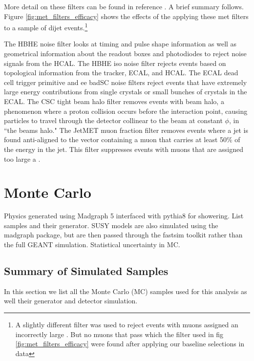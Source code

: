     More detail on these filters can be found in reference \cite[sec 5]{cms_met}. A brief summary follows. Figure \ref{fig:met_filters_efficacy} shows the effects of the applying these met filters to a sample of dijet events.\footnote{A slightly different filter was used to reject events with muons assigned an incorrectly large \pt. But no muons that pass which the filter used in fig \ref{fig:met_filters_efficacy} were found after applying our baseline selections in data}

    The HBHE noise filter looks at timing and pulse shape information as well as geometrical information about the readout boxes and photodiodes to reject noise signals from the HCAL. The HBHE iso noise filter rejects events based on topological information from the tracker, ECAL, and HCAL. The ECAL dead cell trigger primitive and ee badSC noise filters reject events that have extremely large energy contributions from single crystals or small bunches of crystals in the ECAL. The CSC tight beam halo filter removes events with beam halo, a phenomenon where a proton collision occurs before the interaction point, causing particles to travel through the detector collinear to the beam at constant $\phi$, in ``the beams halo." The JetMET muon fraction filter removes events where a jet is found anti-aligned to the \MET vector containing a muon that carries at least 50\% of the energy in the jet. This filter suppresses events with muons that are assigned too large a \pt.

\section{Monte Carlo} \label{sec:monte_carlo}
  Physics generated using Madgraph 5 interfaced with pythia8 for showering. List samples and their generator.
  SUSY models are also simulated using the madgraph package, but are then passed through the fastsim toolkit \cite{fastsim} rather than the full GEANT simulation. Statistical uncertainty in MC.
  \subsection{Summary of Simulated Samples} \label{sec:summary_of_simulated_samples}
    
    In this section we list all the Monte Carlo (MC) samples used for this analysis as well their generator and detector simulation.

